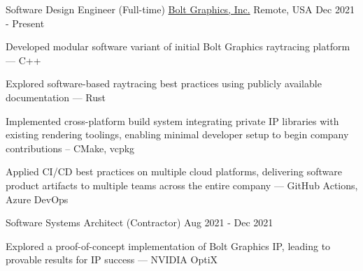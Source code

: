 

\begin{cventries}
  \cventry
    {Software Design Engineer (Full-time)} %
    {\href{https://www.bolt.graphics/}{Bolt Graphics, Inc.}} %
    {Remote, USA} %
    {Dec 2021 - Present} %
    {
      \begin{cvitems} %
        \item Developed modular software variant of initial Bolt Graphics raytracing platform --- C++
        \item Explored software-based raytracing best practices using publicly available documentation --- Rust
        \item Implemented cross-platform build system integrating private IP libraries with existing rendering toolings, enabling minimal developer setup to begin company contributions -- CMake, vcpkg
        \item Applied CI/CD best practices on multiple cloud platforms, delivering software product artifacts to multiple teams across the entire company --- GitHub Actions, Azure DevOps
      \end{cvitems}
    }

  \cventry
    {Software Systems Architect (Contractor)} %
    {} %
    {} %
    {Aug 2021 - Dec 2021} %
    {
      \begin{cvitems} %
        \item Explored a proof-of-concept implementation of Bolt Graphics IP, leading to provable results for IP success --- NVIDIA OptiX
      \end{cvitems}
    }


\end{cventries}
